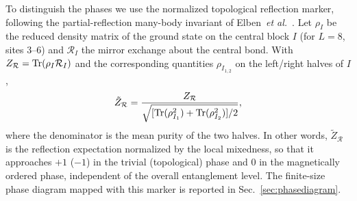 To distinguish the phases we use the normalized topological reflection
marker, following the partial-reflection many-body invariant of
Elben~\textit{et al.}~\cite{elben2020manybody}. Let $\rho_I$ be the reduced density matrix of the ground state
on the central block $I$ (for $L=8$, sites $3$--$6$) and
${\mathcal R}_I$ the mirror exchange about the central bond. With
$Z_{\mathcal R}={\rm Tr}(\rho_I{\mathcal R}_I)$ and the corresponding
quantities $\rho_{I_{1,2}}$ on the left/right halves of $I$,
\begin{equation}
\tilde{Z}_{\mathcal R}=
\frac{Z_{\mathcal R}}
{\sqrt{[{\rm Tr}(\rho_{I_1}^2)+{\rm Tr}(\rho_{I_2}^2)]/2}},
\end{equation}
where the denominator is the mean purity of the two halves.
In other words, $\tilde{Z}_{\mathcal R}$ is the reflection expectation
normalized by the local mixedness, so that it approaches $+1$ ($-1$) in
the trivial (topological) phase and $0$ in the magnetically ordered
phase, independent of the overall entanglement level.
The finite-size phase diagram mapped with this marker is reported in
Sec.~\ref{sec:phasediagram}.
